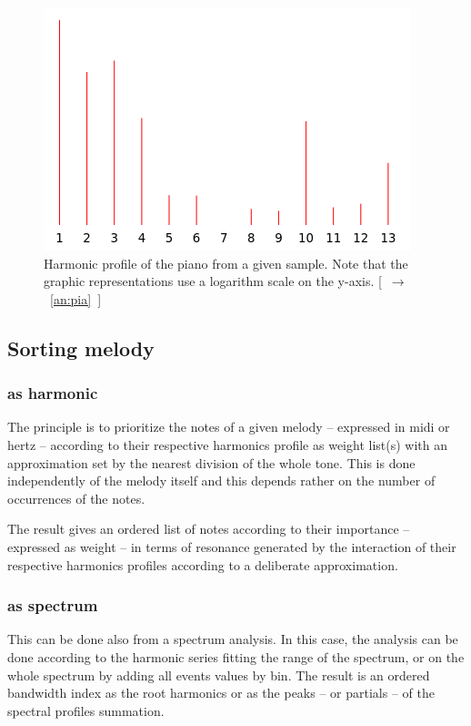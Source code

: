 \begin{figure}[!hbt]
	\begin{center}
		\includegraphics[scale=0.5]{img/4509}
		\caption{Harmonic profile of the piano from a given sample. Note that the graphic representations use a logarithm scale on the y-axis. \mbox{[ $\rightarrow$ \ref{an:pia} ]}}
		\label{fig:piano}
	\end{center}
\end{figure}

\subsection{Sorting melody}

\subsubsection{as harmonic}

The principle is to prioritize the notes of a given melody -- expressed in midi or hertz -- according to their respective harmonics profile as weight list(s) with an approximation set by the nearest division of the whole tone. This is done independently of the melody itself and this depends rather on the number of occurrences of the notes.

The result gives an ordered list of notes according to their importance -- expressed as weight -- in terms of resonance generated by the interaction of their respective harmonics profiles according to a deliberate approximation.

\subsubsection{as spectrum}

This can be done also from a spectrum analysis. In this case, the analysis can be done according to the harmonic series fitting the range of the spectrum, or on the whole spectrum by adding all events values by bin.
The result is an ordered bandwidth index as the root harmonics or as the peaks -- or partials -- of the spectral profiles summation.

